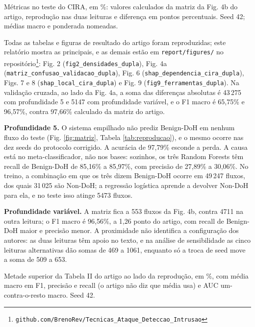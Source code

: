 \documentclass[conference]{IEEEtran}
\newcommand{\tabelacoluna}[1]{{\footnotesize\setlength{\tabcolsep}{3pt}%
  \begin{adjustbox}{max width=\columnwidth}\end{adjustbox}}}
\newcommand{\us}{\_\allowbreak}
\newcommand{\tabelapagina}[1]{{\footnotesize\setlength{\tabcolsep}{3pt}%
  \begin{adjustbox}{max width=\textwidth}\end{adjustbox}}}
\begin{document}
\begin{table}[!t]
\centering
\caption{Métricas no teste do CIRA, em \%: valores calculados da matriz da Fig. 4b do artigo, reprodução nas duas leituras e diferença em pontos percentuais. Seed 42; médias macro e ponderada nomeadas.}
\label{tab:reproducao}
\tabelacoluna{reproducao_metricas}
\end{table}

Todas as tabelas e figuras de resultado do artigo foram reproduzidas; este relatório mostra as principais, e as demais estão em \texttt{report/figures/} no repositório\footnote{\texttt{github.com/BrenoRev/Tecnicas\_Ataque\_Deteccao\_Intrusao}}: Fig. 2 (\texttt{fig2\us densidades\us dupla}), Fig. 4a (\texttt{matriz\us confusao\us validacao\us dupla}), Fig. 6 (\texttt{shap\us dependencia\us cira\us dupla}), Figs. 7 e 8 (\texttt{shap\us local\us cira\us dupla}) e Fig. 9 (\texttt{fig9\us ferramentas\us dupla}). Na validação cruzada, ao lado da Fig. 4a, a soma das diferenças absolutas é 43\,275 com profundidade 5 e 5147 com profundidade variável, e o F1 macro é 65,75\% e 96,57\%, contra 97,66\% calculado da matriz do artigo.

\textbf{Profundidade 5.} O sistema empilhado não prediz Benign-DoH em nenhum fluxo do teste (Fig. \ref{fig:matriz}, Tabela \ref{tab:reproducao}), e o mesmo ocorre nas dez seeds do protocolo corrigido. A acurácia de 97,79\% esconde a perda. A causa está no meta-classificador, não nos bases: sozinhos, os três Random Forests têm recall de Benign-DoH de 85,16\% a 85,97\%, com precisão de 27,89\% a 30,06\%. No treino, a combinação em que os três dizem Benign-DoH ocorre em 49\,247 fluxos, dos quais 31\,025 são Non-DoH; a regressão logística aprende a devolver Non-DoH para ela, e no teste isso atinge 5473 fluxos.

\textbf{Profundidade variável.} A matriz fica a 553 fluxos da Fig. 4b, contra 4711 na outra leitura; o F1 macro é 96,56\%, a 1,26 ponto do artigo, com recall de Benign-DoH maior e precisão menor. A proximidade não identifica a configuração dos autores: as duas leituras têm apoio no texto, e na análise de sensibilidade as cinco leituras alternativas dão somas de 469 a 1061, enquanto só a troca de seed move a soma de 509 a 653.

\begin{table}[!t]
\centering
\caption{Metade superior da Tabela II do artigo ao lado da reprodução, em \%, com média macro em F1, precisão e recall (o artigo não diz que média usa) e AUC um-contra-o-resto macro. Seed 42.}
\label{tab:tabela2}
\tabelapagina{tabela2_superior_macro_dupla}
\end{table}
\end{document}
